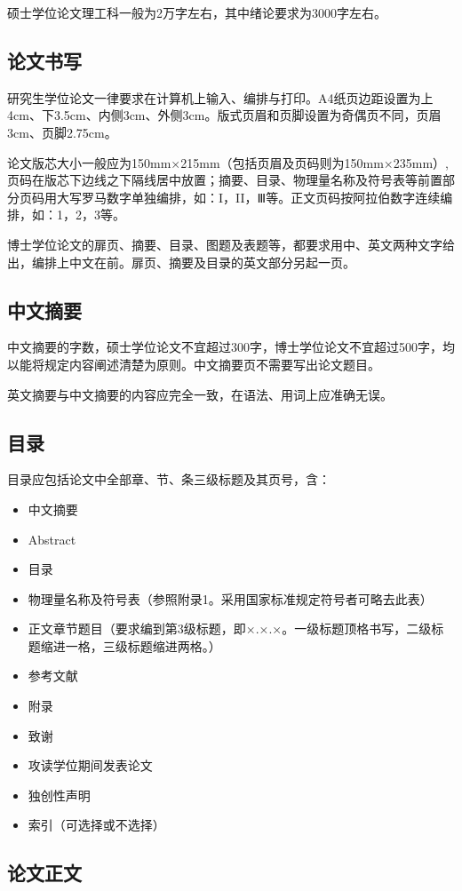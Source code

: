 硕士学位论文理工科一般为2万字左右，其中绪论要求为3000字左右。

\subsection{论文书写}
研究生学位论文一律要求在计算机上输入、编排与打印。A4纸页边距设置为上4cm、下3.5cm、内侧3cm、外侧3cm。版式页眉和页脚设置为奇偶页不同，页眉3cm、页脚2.75cm。

论文版芯大小一般应为150mm×215mm（包括页眉及页码则为150mm×235mm）,页码在版芯下边线之下隔线居中放置；摘要、目录、物理量名称及符号表等前置部分页码用大写罗马数字单独编排，如：I，II，Ⅲ等。正文页码按阿拉伯数字连续编排，如：1，2，3等。

博士学位论文的扉页、摘要、目录、图题及表题等，都要求用中、英文两种文字给出，编排上中文在前。扉页、摘要及目录的英文部分另起一页。

\subsection{中文摘要}
中文摘要的字数，硕士学位论文不宜超过300字，博士学位论文不宜超过500字，均以能将规定内容阐述清楚为原则。中文摘要页不需要写出论文题目。

英文摘要与中文摘要的内容应完全一致，在语法、用词上应准确无误。

\subsection{目录}
目录应包括论文中全部章、节、条三级标题及其页号，含：
\begin{itemize}
    \item 中文摘要
    \item Abstract
    \item 目录
    \item 物理量名称及符号表（参照附录1。采用国家标准规定符号者可略去此表）
    \item 正文章节题目（要求编到第3级标题，即×.×.×。一级标题顶格书写，二级标题缩进一格，三级标题缩进两格。）
    \item 参考文献
    \item 附录
    \item 致谢
    \item 攻读学位期间发表论文
    \item 独创性声明
    \item 索引（可选择或不选择）
\end{itemize}

\subsection{论文正文}

